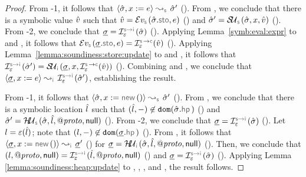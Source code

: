 \begin{proof}
 \noindent {} From \hyp{1}, it follows that $\absbsemrule{\sstate, \jvar := \jsilexpr}{\sstate'}{\symbolic}$ (). 
From , we conclude that there is a symbolic value $\hat{v}$ such that 
$\sexprv = \evalexpr{\symbolic}(\sstate.\stosel, \jsilexpr)$ () and $\sstate' = \stupdt{\symbolic}(\sstate, \jvar, \sexprv)$ (). 
From \hyp{2}, we conclude that $\istate = \interpret{\symbinst}{\senv}(\sstate)$ (). 
Applying Lemma~\ref{symb:eval:expr} to  and , it follows that 
$\evalexpr{\symbolic}(\istate.\stosel, \jsilexpr) = \interpret{\symbconc}{\senv}(\sexprv)$ (). 
Applying Lemma~\ref{lemma:soundiness:store:update} to  and , it follows
that $ \interpret{\symbinst}{\senv}(\sstate') = \stupdt{\instrumented}(\istate, \jvar, \interpret{\symbconc}{\senv}(\sexprv))$ (). 
Combining  and , we conclude that $\absbsemrule{\istate,\jvar := \jsilexpr}{\interpret{\symbinst}{\senv}(\sstate')}{\instrumented}$, establishing the result. 
\vspace{5pt}

 \noindent {} From \hyp{1}, it follows that $\absbsemrule{\sstate, \jvar := \jsilnew()}{\sstate'}{\symbolic}$ (). 
From , we conclude that there is a symbolic location $\hat{l}$ such that $(\sloc, -) \not\in \domain(\sstate.\hpsel)$ () and 
$\sstate' = \hpupdt{\symbolic}(\sstate, \sloc, \protop, \jnull)$ (). From \hyp{2}, 
we conclude that $\istate = \interpret{\symbinst}{\senv}(\sstate)$ (). 
Let $l = \varepsilon(\hat{l})$; note that $(\loc, -) \not\in \domain(\istate.\hpsel)$ (). 
From , it follows that $\absbsemrule{\istate, \jvar := \jsilnew()}{\istate'}{\instrumented}$ () for 
$\istate = \hpupdt{\instrumented}(\sstate, \sloc, \protop, \jnull)$ (). 
Then, we conclude that 
$(\loc, \protop, \jnull) = \interpret{\symbinst}{\senv}(\sloc, \protop, \jnull)$ ()
and $\istate = \interpret{\symbinst}{\senv}(\sstate)$ (). 
Applying Lemma \ref{lemma:soundiness:heap:update} to , , , and , 
the result follows. 
\vspace{5pt}


\end{proof}

